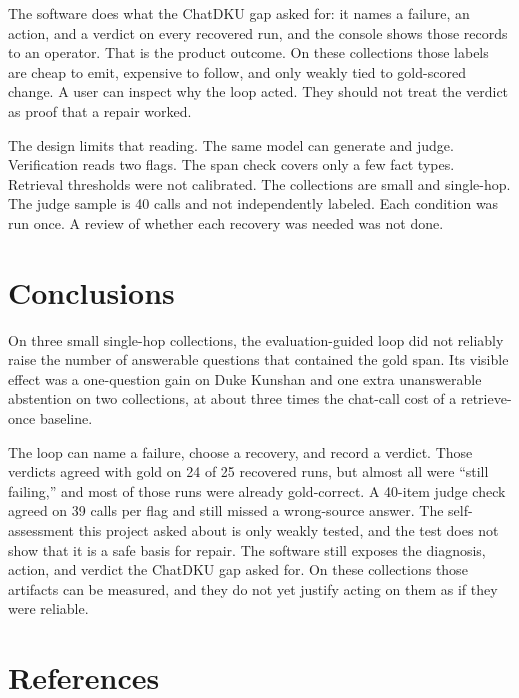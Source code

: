 \documentclass[12pt, a4paper, oneside]{report}
\begin{document}
The software does what the ChatDKU gap asked for: it names a failure, an
action, and a verdict on every recovered run, and the console shows those
records to an operator. That is the product outcome. On these collections
those labels are cheap to emit, expensive to follow, and only weakly tied
to gold-scored change. A user can inspect why the loop acted. They should
not treat the verdict as proof that a repair worked.

The design limits that reading. The same model can generate and judge.
Verification reads two flags. The span check covers only a few fact
types. Retrieval thresholds were not calibrated. The collections are
small and single-hop. The judge sample is 40 calls and not independently
labeled. Each condition was run once. A review of whether each recovery
was needed was not done.


\chapter{Conclusions}
\label{conclusions}

On three small single-hop collections, the evaluation-guided loop did
not reliably raise the number of answerable questions that contained the
gold span. Its visible effect was a one-question gain on Duke Kunshan and
one extra unanswerable abstention on two collections, at about three
times the chat-call cost of a retrieve-once baseline.

The loop can name a failure, choose a recovery, and record a verdict.
Those verdicts agreed with gold on 24 of 25 recovered runs, but almost
all were ``still failing,'' and most of those runs were already
gold-correct. A 40-item judge check agreed on 39 calls per flag and
still missed a wrong-source answer. The self-assessment this project
asked about is only weakly tested, and the test does not show that it is
a safe basis for repair. The software still exposes the diagnosis,
action, and verdict the ChatDKU gap asked for. On these collections
those artifacts can be measured, and they do not yet justify acting on
them as if they were reliable.


\chapter*{References}
\label{references}
\end{document}
